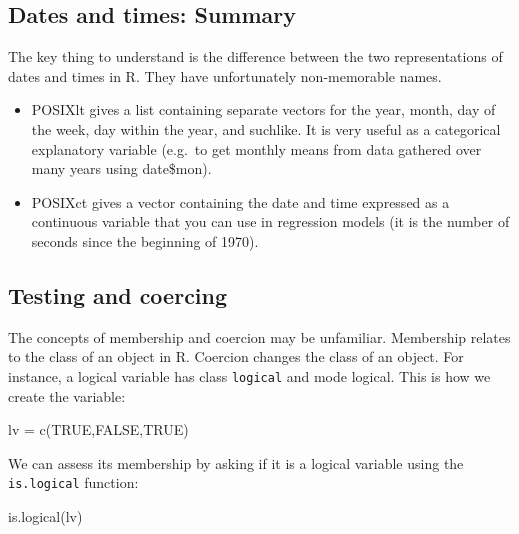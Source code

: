 \documentclass[
]{book}
\newenvironment{Shaded}{\begin{snugshade}}{\end{snugshade}}
\newcommand{\ConstantTok}[1]{\textcolor[rgb]{0.00,0.00,0.00}{#1}}
\newcommand{\FunctionTok}[1]{\textcolor[rgb]{0.00,0.00,0.00}{#1}}
\newcommand{\NormalTok}[1]{#1}
\newcommand{\OtherTok}[1]{\textcolor[rgb]{0.56,0.35,0.01}{#1}}
\providecommand{\tightlist}{%
  \setlength{\itemsep}{0pt}\setlength{\parskip}{0pt}}
\theoremstyle{definition}
\theoremstyle{definition}
\theoremstyle{definition}
\theoremstyle{definition}
\theoremstyle{remark}
\begin{document}
\hypertarget{dates-and-times-summary}{%
\subsection{Dates and times: Summary}\label{dates-and-times-summary}}

The key thing to understand is the difference between the two representations of dates and times in R. They have unfortunately non-memorable names.

\begin{itemize}
\tightlist
\item
  POSIXlt gives a list containing separate vectors for the year, month, day of the week, day within the year, and suchlike. It is very useful as a categorical explanatory variable (e.g.~to get monthly means from data gathered over many years using date\$mon).
\item
  POSIXct gives a vector containing the date and time expressed as a continuous variable that you can use in regression models (it is the number of seconds since the beginning of 1970).
\end{itemize}

\hypertarget{testing-and-coercing}{%
\subsection{Testing and coercing}\label{testing-and-coercing}}

The concepts of membership and coercion may be unfamiliar. Membership relates to the class of an object in R. Coercion changes the class of an object. For instance, a logical variable has class \texttt{logical} and mode logical. This is how we create the variable:

\begin{Shaded}
\begin{Highlighting}[]
\NormalTok{lv }\OtherTok{=} \FunctionTok{c}\NormalTok{(}\ConstantTok{TRUE}\NormalTok{,}\ConstantTok{FALSE}\NormalTok{,}\ConstantTok{TRUE}\NormalTok{)}
\end{Highlighting}
\end{Shaded}

We can assess its membership by asking if it is a logical variable using the \texttt{is.logical} function:

\begin{Shaded}
\begin{Highlighting}[]
\FunctionTok{is.logical}\NormalTok{(lv)}
\end{Highlighting}
\end{Shaded}
\end{document}
